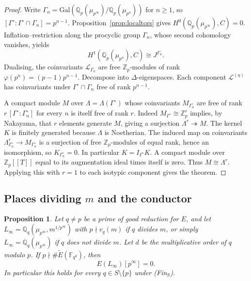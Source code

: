 \documentclass[11pt]{article}
\newtheorem{proposition}[theorem]{Proposition}
\theoremstyle{definition}
\theoremstyle{remark}
\newcommand{\Z}{\mathbb{Z}}
\newcommand{\Q}{\mathbb{Q}}
\newcommand{\F}{\mathbb{F}}
\newcommand{\Gal}{\mathrm{Gal}}
\newcommand{\cL}{\mathcal{L}}
\newcommand{\Lam}{\Lambda}
\newcommand{\Gam}{\Gamma^{\circ}}
\begin{document}
\begin{proof}
Write \(\Gamma_n=\Gal(\Q_p(\mu_{p^\infty})/\Q_p(\mu_{p^n}))\) for \(n\ge 1\), so \([\Gam:\Gam\cap\Gamma_n]=p^{n-1}\). Proposition~\ref{prop:localtors} gives \(H^0(\Q_p(\mu_{p^\infty}),C)=0\). Inflation--restriction along the procyclic group \(\Gamma_n\), whose second cohomology vanishes, yields
\[
H^1(\Q_p(\mu_{p^n}),C)\cong J^{\Gamma_n}.
\]
Dualising, the coinvariants \(\cL_{\Gamma_n}\) are free \(\Z_p\)-modules of rank \(\varphi(p^n)=(p-1)p^{n-1}\). Decompose into \(\Delta\)-eigenspaces. Each component \(\cL^{(\eta)}\) has coinvariants under \(\Gam\cap\Gamma_n\) free of rank \(p^{n-1}\).

A compact module \(M\) over \(\Lam=\Lam(\Gam)\) whose coinvariants \(M_{\Gam_n}\) are free of rank \(r\,[\Gam:\Gam_n]\) for every \(n\) is itself free of rank \(r\). Indeed \(M_{\Gam}\cong\Z_p^r\) implies, by Nakayama, that \(r\) elements generate \(M\), giving a surjection \(\Lam^r\twoheadrightarrow M\). The kernel \(K\) is finitely generated because \(\Lam\) is Noetherian. The induced map on coinvariants \(\Lam^r_{\Gam_n}\to M_{\Gam_n}\) is a surjection of free \(\Z_p\)-modules of equal rank, hence an isomorphism, so \(K_{\Gam_n}=0\). In particular \(K=I_{\Gam}K\). A compact module over \(\Z_p[[T]]\) equal to its augmentation ideal times itself is zero. Thus \(M\cong\Lam^r\). Applying this with \(r=1\) to each isotypic component gives the theorem.
\end{proof}

\subsection{Places dividing \(m\) and the conductor}

\begin{proposition}
\label{prop:finS}
Let \(q\neq p\) be a prime of good reduction for \(E\), and let \(L_\infty=\Q_q(\mu_{p^\infty},m^{1/p^\infty})\) with \(p\nmid v_q(m)\) if \(q\) divides \(m\), or simply \(L_\infty=\Q_q(\mu_{p^\infty})\) if \(q\) does not divide \(m\). Let \(d\) be the multiplicative order of \(q\) modulo \(p\). If \(p\nmid \#\widetilde{E}(\F_{q^d})\), then
\[
E(L_\infty)[p^\infty]=0.
\]
In particular this holds for every \(q\in S\setminus\{p\}\) under \textup{(Fin\(_S\))}.
\end{proposition}
\end{document}
